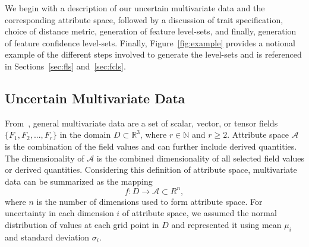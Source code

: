 \setlength{\belowdisplayskip}{5pt} \setlength{\belowdisplayshortskip}{5pt}
\setlength{\abovedisplayskip}{5pt} \setlength{\abovedisplayshortskip}{5pt}

We begin with a description of our uncertain multivariate data and the corresponding attribute space, followed by a discussion of trait specification, choice of distance metric, generation of feature level-sets, and finally, generation of feature confidence level-sets.
%
Finally, Figure~\ref{fig:example} provides a notional example of the different steps involved to generate the level-sets and is referenced in Sections~\ref{sec:fls} and~\ref{sec:fcls}.
%

\vspace{-2mm}
\subsection{Uncertain Multivariate Data}
%
From~\cite{jankowai2020feature}, general multivariate data are a set of scalar, vector, or tensor fields $\{F_1,F_2,...,F_r\}$ in the domain $D \subset \mathbb{R}^{3}$, where $r\in\mathbb{N}$ and $r\geq2$.
%
%
%
Attribute space $\mathcal{A}$ is the combination of the field values and can further include derived quantities.
%
The dimensionality of $\mathcal{A}$ is the combined dimensionality of all selected field values or derived quantities.
%
Considering this definition of attribute space, multivariate data can be summarized as the mapping
\begin{equation}
f : D \to \mathcal{A} \subset R^{n},
\end{equation}
%
where $n$ is the number of dimensions used to form attribute space. 
%
%
For uncertainty in each dimension $i$ of attribute space, we assumed the normal distribution of values at each grid point in $D$ and represented it using mean ${\mu}_{i}$ and standard deviation ${\sigma}_{i}$. 

\vspace{-2mm}
